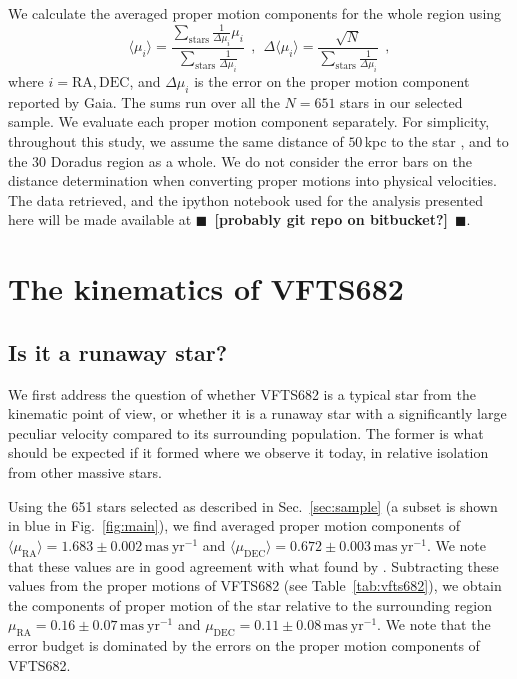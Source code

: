 \documentclass{aa}
\newcommand{\todo}[1]{{\large $\blacksquare$~\textbf{\color{red}[#1]}}~$\blacksquare$}
\DeclareRobustCommand{\Figref}[1]{Fig.~\ref{#1}}
\DeclareRobustCommand{\Tabref}[1]{Table~\ref{#1}}
\DeclareRobustCommand{\Secref}[1]{Sec.~\ref{#1}}
\begin{document}
We calculate the averaged proper motion components for the whole
region using 
\begin{equation}
  \label{eq:mean}
  \langle \mu_i\rangle = \frac{\sum_\mathrm{stars}\frac{1}{\Delta
      \mu_i}\mu_i}{\sum_\mathrm{stars} \frac{1}{\Delta \mu_i}} \ \ , \
  \ \Delta \langle \mu_i\rangle = \frac{\sqrt{N}}{\sum_\mathrm{stars}
    \frac{1}{\Delta \mu_i}} \ \ ,
\end{equation}
where $i = \mathrm{RA}, \mathrm{DEC}$, and $\Delta \mu_i$ is the error
on the proper motion component reported by Gaia. The sums run over
all the $N=651$ stars in our selected sample. We evaluate each proper motion
component separately. For simplicity, throughout this study, we assume the same
distance of $50$\,kpc to the star \citep[][]{lebouteiller:08}, and to
the 30 Doradus region as a whole. We do not consider the error bars on
the distance determination when converting proper motions into
physical velocities. The data retrieved, and the ipython notebook used for the analysis
presented here will be made available at \todo{probably git repo on bitbucket?}. 

\section{The kinematics of VFTS682}
\label{sec:results}

\subsection{Is it a runaway star?}
\label{sec:runaway}
We first address the question of whether VFTS682 is a typical star
from the kinematic point of view, or whether it is a runaway star with
a significantly large peculiar velocity compared to its surrounding population. The former is what should
be expected if it formed where we observe it today, in relative
isolation from other massive stars.

Using the 651 stars selected as described in \Secref{sec:sample} (a
subset is shown in blue in \Figref{fig:main}), we find averaged proper motion components of
$\langle\mu_\mathrm{RA}\rangle = 1.683\pm0.002\,\mathrm{mas\ yr^{-1}}$ and
$\langle\mu_\mathrm{DEC}\rangle =
0.672\pm0.003\,\mathrm{mas\ yr^{-1}}$. We note that these values are
in good agreement with what found by \cite{lennon:18}. Subtracting these values from the
proper motions of VFTS682 (see \Tabref{tab:vfts682}), we obtain the
components of proper motion of the star relative to the surrounding region
$\mu_\mathrm{RA} = 0.16\pm 0.07\,\mathrm{mas\ yr^{-1}}$ and $\mu_\mathrm{DEC} =
0.11\pm 0.08\,\mathrm{mas\ yr^{-1}}$. We note that the error budget is
dominated by the errors on the proper motion components of VFTS682.
\end{document}
